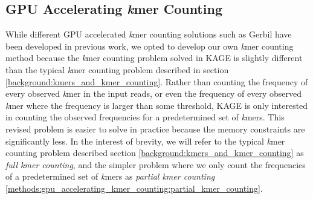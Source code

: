 \subsection{GPU Accelerating \textit{k}mer Counting}
While different GPU accelerated \textit{k}mer counting solutions such as Gerbil \cite{gerbil} have been developed in previous work, we opted to develop our own \textit{k}mer counting method because the \textit{k}mer counting problem solved in KAGE is slightly different than the typical \textit{k}mer counting problem described in section \ref{background:kmers_and_kmer_counting}.
Rather than counting the frequency of every observed \textit{k}mer in the input reads, or even the frequency of every observed \textit{k}mer where the frequency is larger than some threshold, KAGE is only interested in counting the observed frequencies for a predetermined set of \textit{k}mers.
This revised problem is easier to solve in practice because the memory constraints are significantly less.
In the interest of brevity, we will refer to the typical \textit{k}mer counting problem described section \ref{background:kmers_and_kmer_counting} as \textit{full kmer counting}, and the simpler problem where we only count the frequencies of a predetermined set of \textit{k}mers as \textit{partial kmer counting} \ref{methods:gpu_accelerating_kmer_counting:partial_kmer_counting}.


